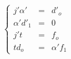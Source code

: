 \begin{equation*}
\left\{ \begin{array}{rcl} j'\alpha' & = & d'_o \\ \alpha'd'_1 & = & 0 \\ j't & = & f_o \\ td_o & = & \alpha'f_1 \end{array} \right.
\end{equation*}

